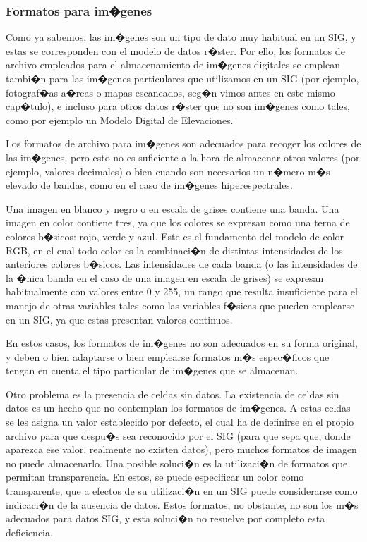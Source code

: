 \subsubsection{Formatos para im�genes}

Como ya sabemos, las im�genes son un tipo de dato muy habitual en un SIG, y estas se corresponden con el modelo de datos r�ster. Por ello, los formatos de archivo empleados para el almacenamiento de im�genes digitales se emplean tambi�n para las im�genes particulares que utilizamos en un SIG (por ejemplo, fotograf�as a�reas o mapas escaneados, seg�n vimos antes en este mismo cap�tulo), e incluso para otros datos r�ster que no son im�genes como tales, como por ejemplo un Modelo Digital de Elevaciones.

Los formatos de archivo para im�genes son adecuados para recoger los colores de las im�genes, pero esto no es suficiente a la hora de almacenar otros valores (por ejemplo, valores decimales) o bien cuando son necesarios un n�mero m�s elevado de bandas, como en el caso de im�genes hiperespectrales. 

Una imagen en blanco y negro o en escala de grises contiene una banda. Una imagen en color contiene tres, ya que los colores se expresan como una terna de colores b�sicos: rojo, verde y azul. Este es el fundamento del modelo de color RGB, en el cual todo color es la combinaci�n de distintas intensidades de los anteriores colores b�sicos. Las intensidades de cada banda (o las intensidades de la �nica banda en el caso de una imagen en escala de grises) se expresan habitualmente con valores entre 0 y 255, un rango que resulta insuficiente para el manejo de otras variables tales como las variables f�sicas que pueden emplearse en un SIG, ya que estas presentan valores continuos.  

En estos casos, los formatos de im�genes no son adecuados en su forma original, y deben o bien adaptarse o bien emplearse formatos m�s espec�ficos que tengan en cuenta el tipo particular de im�genes que se almacenan.

Otro problema es la presencia de celdas sin datos. La existencia de celdas sin datos es un hecho que no contemplan los formatos de im�genes. A estas celdas se les asigna un valor establecido por defecto, el cual ha de definirse en el propio archivo para que despu�s sea reconocido por el SIG (para que sepa que, donde aparezca ese valor, realmente no existen datos), pero muchos formatos de imagen no puede almacenarlo. Una posible soluci�n es la utilizaci�n de formatos que permitan transparencia. En estos, se puede especificar un color como transparente, que a efectos de su utilizaci�n en un SIG puede considerarse como indicaci�n de la ausencia de datos. Estos formatos, no obstante, no son los m�s adecuados para datos SIG, y esta soluci�n no resuelve por completo esta deficiencia.

